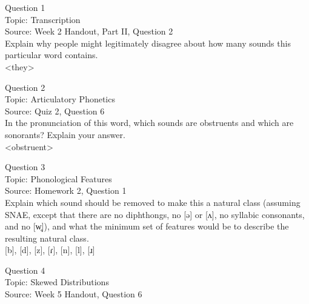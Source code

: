 \documentclass[12pt]{article}
\begin{document}
\begin{center}
\textbf{{\color{blue}{\HUGE START OF EXAM\\}}}

\textbf{{\color{blue}{\HUGE Student ID: 85086\\}}}

\textbf{{\color{blue}{\HUGE \\}}}

\end{center}
\newpage

{\large Question 1}\\

Topic: Transcription\\
Source: Week 2 Handout, Part II, Question 2\\

Explain why people might legitimately disagree about how many sounds this particular word contains.\\

<they>


\newpage

{\large Question 2}\\

Topic: Articulatory Phonetics\\
Source: Quiz 2, Question 6\\

In the pronunciation of this word, which sounds are obstruents and which are sonorants? Explain your answer.\\

<obstruent>


\newpage

{\large Question 3}\\

Topic: Phonological Features\\
Source: Homework 2, Question 1\\

Explain which sound should be removed to make this a natural class (assuming SNAE, except that there are no diphthongs, no [ə] or [ʌ], no syllabic consonants, and no [w̥]), and what the minimum set of features would be to describe the resulting natural class.\\

{[b]}, {[d]}, {[z]}, {[ɾ]}, {[n]}, {[l]}, {[ɹ]}


\newpage

{\large Question 4}\\

Topic: Skewed Distributions\\
Source: Week 5 Handout, Question 6\\
\end{document}
